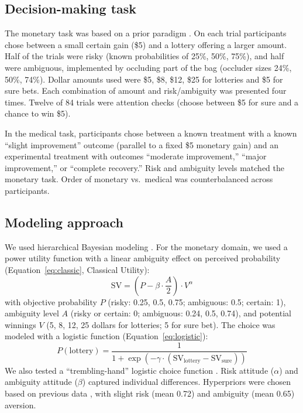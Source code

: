 \documentclass[11pt]{article}
\begin{document}
\subsection{Decision-making task}
The monetary task was based on a prior paradigm \cite{tymula2013aging}. On each trial participants chose between a small certain gain (\$5) and a lottery offering a larger amount. Half of the trials were risky (known probabilities of 25\%, 50\%, 75\%), and half were ambiguous, implemented by occluding part of the bag (occluder sizes 24\%, 50\%, 74\%). Dollar amounts used were \$5, \$8, \$12, \$25 for lotteries and \$5 for sure bets. Each combination of amount and risk/ambiguity was presented four times. Twelve of 84 trials were attention checks (choose between \$5 for sure and a chance to win \$5).

In the medical task, participants chose between a known treatment with a known ``slight improvement'' outcome (parallel to a fixed \$5 monetary gain) and an experimental treatment with outcomes ``moderate improvement,'' ``major improvement,'' or ``complete recovery.'' Risk and ambiguity levels matched the monetary task. Order of monetary vs.\ medical was counterbalanced across participants.

\subsection{Modeling approach}
We used hierarchical Bayesian modeling \cite{lee2014bayesian}. For the monetary domain, we used a power utility function \cite{holt2002risk} with a linear ambiguity effect on perceived probability (Equation~\ref{eq:classic}, Classical Utility):
\begin{equation}
\mathrm{SV} = \left(P - \beta \cdot \frac{A}{2}\right) \cdot V^{\alpha}
\label{eq:classic}
\end{equation}
with objective probability $P$ (risky: 0.25, 0.5, 0.75; ambiguous: 0.5; certain: 1), ambiguity level $A$ (risky or certain: 0; ambiguous: 0.24, 0.5, 0.74), and potential winnings $V$ (5, 8, 12, 25 dollars for lotteries; 5 for sure bet). The choice was modeled with a logistic function (Equation~\ref{eq:logistic}):
\begin{equation}
P(\text{lottery}) = \frac{1}{1 + \exp(-\gamma \cdot (\mathrm{SV}_{\text{lottery}} - \mathrm{SV}_{\text{sure}}))}
\label{eq:logistic}
\end{equation}
We also tested a ``trembling-hand'' logistic choice function \cite{scholten2015trembling}. Risk attitude ($\alpha$) and ambiguity attitude ($\beta$) captured individual differences. Hyperpriors were chosen based on previous data \cite{tymula2013aging}, with slight risk (mean 0.72) and ambiguity (mean 0.65) aversion.
\end{document}
